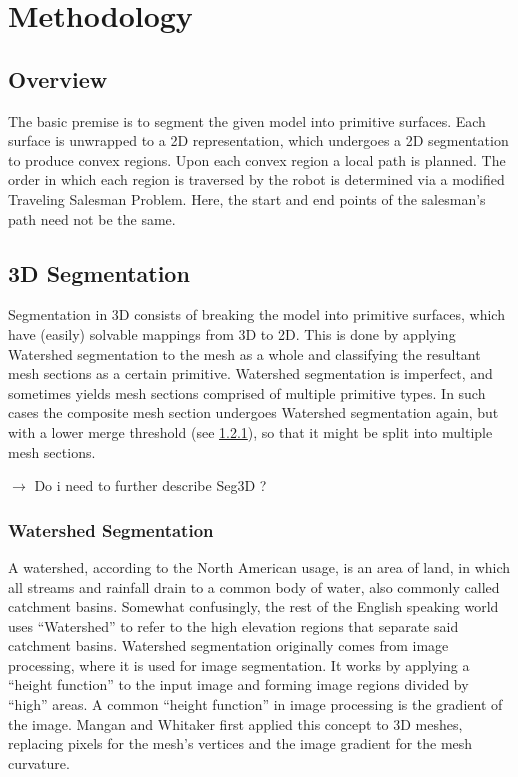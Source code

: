 \chapter{Methodology}\label{methodology}

\section{Overview}
The basic premise is to segment the given model into primitive surfaces.
Each surface is unwrapped to a 2D representation, which undergoes a 2D segmentation to produce convex regions.
Upon each convex region a local path is planned.
The order in which each region is traversed by the robot is determined via a modified Traveling Salesman Problem.
Here, the start and end points of the salesman's path need not be the same.

\section{3D Segmentation}
Segmentation in 3D consists of breaking the model into primitive surfaces,
which have (easily) solvable mappings from 3D to 2D.
This is done by applying Watershed segmentation to the mesh as a whole and classifying the resultant mesh sections as a certain primitive.
Watershed segmentation is imperfect, and sometimes yields mesh sections comprised of multiple primitive types.
In such cases the composite mesh section undergoes Watershed segmentation again, but with a lower merge threshold (see \ref{ws_seg}), so that it might be split into multiple mesh sections.

$\rightarrow$ Do i need to further describe Seg3D ?

\subsection{Watershed Segmentation}\label{ws_seg}
A watershed, according to the North American usage, is an area of land, in which all streams and rainfall drain to a common body of water\cite{USGS_Watersheds}, also commonly called catchment basins.
Somewhat confusingly, the rest of the English speaking world uses ``Watershed'' to refer to the high elevation regions that separate said catchment basins.
Watershed segmentation originally comes from image processing, where it is used for image segmentation\cite{ImageSegWS, DigitalImageProc}.
It works by applying a ``height function'' to the input image and forming image regions divided by ``high'' areas.
A common ``height function'' in image processing is the gradient of the image\cite{ImageSegWS}.
Mangan and Whitaker first applied this concept to 3D meshes, replacing pixels for the mesh's vertices and the image gradient for the mesh curvature\cite{Watershed}.

